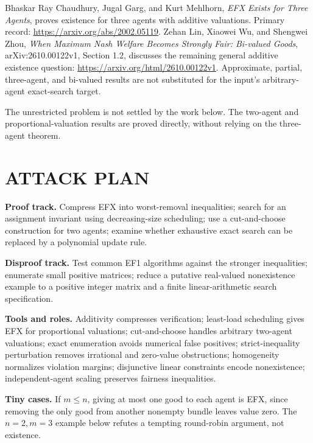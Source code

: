 \documentclass[11pt,a4paper]{article}
\theoremstyle{definition}\newtheorem{definition}[theorem]{Definition}
\theoremstyle{remark}\newtheorem{remark}[theorem]{Remark}
\newcommand{\1}{\mathbf 1}
\begin{document}
Bhaskar Ray Chaudhury, Jugal Garg, and Kurt Mehlhorn, \emph{EFX Exists for Three Agents}, proves existence for three agents with additive valuations. Primary record: \url{https://arxiv.org/abs/2002.05119}. Zehan Lin, Xiaowei Wu, and Shengwei Zhou, \emph{When Maximum Nash Welfare Becomes Strongly Fair: Bi-valued Goods}, arXiv:2610.00122v1, Section 1.2, discusses the remaining general additive existence question: \url{https://arxiv.org/html/2610.00122v1}. Approximate, partial, three-agent, and bi-valued results are not substituted for the input's arbitrary-agent exact-search target.

The unrestricted problem is not settled by the work below. The two-agent and proportional-valuation results are proved directly, without relying on the three-agent theorem.

\section{ATTACK PLAN}
\textbf{Proof track.} Compress EFX into worst-removal inequalities; search for an assignment invariant using decreasing-size scheduling; use a cut-and-choose construction for two agents; examine whether exhaustive exact search can be replaced by a polynomial update rule.

\textbf{Disproof track.} Test common EF1 algorithms against the stronger inequalities; enumerate small positive matrices; reduce a putative real-valued nonexistence example to a positive integer matrix and a finite linear-arithmetic search specification.

\textbf{Tools and roles.} Additivity compresses verification; least-load scheduling gives EFX for proportional valuations; cut-and-choose handles arbitrary two-agent valuations; exact enumeration avoids numerical false positives; strict-inequality perturbation removes irrational and zero-value obstructions; homogeneity normalizes violation margins; disjunctive linear constraints encode nonexistence; independent-agent scaling preserves fairness inequalities.

\textbf{Tiny cases.} If $m\le n$, giving at most one good to each agent is EFX, since removing the only good from another nonempty bundle leaves value zero. The $n=2,m=3$ example below refutes a tempting round-robin argument, not existence.
\end{document}
